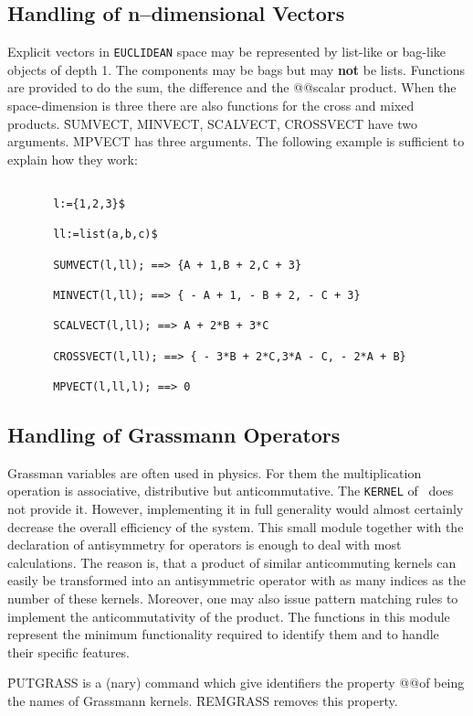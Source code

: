 \subsection{Handling of n--dimensional Vectors}
Explicit vectors in {\tt EUCLIDEAN} space may be represented by
list-like or bag-like objects of depth 1.
The components may be bags but may {\bf not} be lists.
Functions are provided to do the sum, the difference and the
@@scalar product. When the space-dimension is three there are also functions
for the cross and mixed products.
\f{SUMVECT, MINVECT, SCALVECT, CROSSVECT} have two arguments.
\f{MPVECT} has three arguments. The following example
is sufficient to explain how they work:
\begin{verbatim}

       l:={1,2,3}$

       ll:=list(a,b,c)$

       SUMVECT(l,ll); ==> {A + 1,B + 2,C + 3}

       MINVECT(l,ll); ==> { - A + 1, - B + 2, - C + 3}

       SCALVECT(l,ll); ==> A + 2*B + 3*C

       CROSSVECT(l,ll); ==> { - 3*B + 2*C,3*A - C, - 2*A + B}

       MPVECT(l,ll,l); ==> 0

\end{verbatim}
\subsection{Handling of Grassmann Operators}
Grassman variables are often used in physics. For them the multiplication
operation is associative, distributive but anticommutative. The
{\tt KERNEL} of \REDUCE\ does not provide it. However, implementing
it in full generality would almost
certainly decrease the overall efficiency of the system. This small
module together with the declaration of antisymmetry for operators is
enough to deal with most calculations. The reason is, that a
product of similar anticommuting kernels can easily  be transformed
into an antisymmetric operator with as many indices as the number of
these kernels. Moreover, one may also issue pattern matching rules
to implement the anticommutativity of the product.
The functions in this module represent the minimum functionality
required to identify them and to handle their specific features.

\f{PUTGRASS} is a (nary) command which give identifiers the property
@@of being the names of Grassmann kernels. \f{REMGRASS} removes this property.

